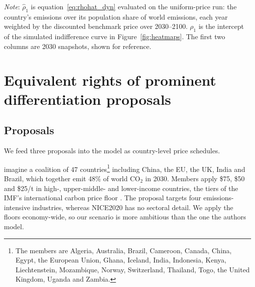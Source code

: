 \documentclass[12pt,english]{article}
\theoremstyle{remark}
\begin{document}
\begin{table}[tbp]
\centering
\small
\singlespacing
\begin{threeparttable}
\caption{Allocation at which each country is indifferent when the autarky price equals the benchmark ($\pi_i=1$)}
\label{tab:summary}
\begin{tablenotes}\footnotesize
  \item \emph{Note}: $\hat\rho_1$ is equation~\eqref{eq:rhohat_dyn} evaluated on the uniform-price run: the country's emissions over its population share of world emissions, each year weighted by the discounted benchmark price over 2030--2100. $\rho_1$ is the intercept of the simulated indifference curve in Figure~\ref{fig:heatmaps}. The first two columns are 2030 snapshots, shown for reference.
\end{tablenotes}
\end{threeparttable}
\end{table}

\section{Equivalent rights of prominent differentiation proposals}
\label{sec:proposals}

\subsection{Proposals}

We feed three proposals into the model as country-level price schedules.

\citet{wolfram_building_2025} imagine a coalition of 47 countries\footnote{The members are Algeria, Australia, Brazil, Cameroon, Canada, China, Egypt, the European Union, Ghana, Iceland, India, Indonesia, Kenya, Liechtenstein, Mozambique, Norway, Switzerland, Thailand, Togo, the United Kingdom, Uganda and Zambia.} including China, the EU, the UK, India and Brazil, which together emit 48\% of world CO$_2$ in 2030. Members apply \$75, \$50 and \$25/t in high-, upper-middle- and lower-income countries, the tiers of the IMF's international carbon price floor \citep{parry_proposal_2021}. The proposal targets four emissions-intensive industries, whereas NICE2020 has no sectoral detail. We apply the floors economy-wide, so our scenario is more ambitious than the one the authors model.
\end{document}
